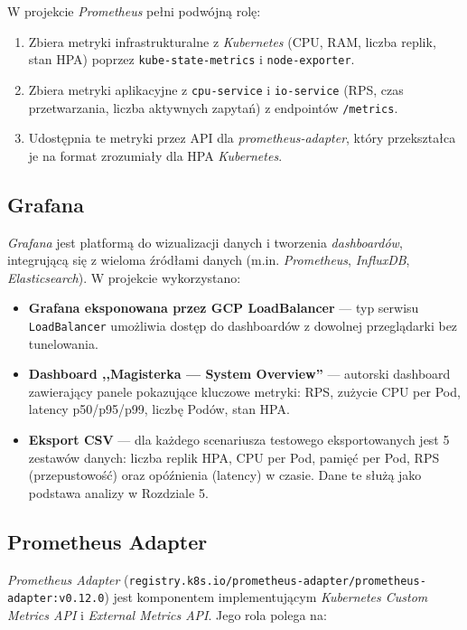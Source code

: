 W projekcie \textit{Prometheus} pełni podwójną rolę:
\begin{enumerate}
  \item Zbiera metryki infrastrukturalne z \textit{Kubernetes} (CPU, RAM, liczba replik, stan HPA) poprzez \texttt{kube-state-metrics} i \texttt{node-exporter}.
  \item Zbiera metryki aplikacyjne z \texttt{cpu-service} i \texttt{io-service} (RPS, czas przetwarzania, liczba aktywnych zapytań) z endpointów \texttt{/metrics}.
  \item Udostępnia te metryki przez API dla \textit{prometheus-adapter}, który przekształca je na format zrozumiały dla HPA \textit{Kubernetes}.
\end{enumerate}

\subsection{Grafana}

\textit{Grafana} jest platformą do wizualizacji danych i tworzenia \textit{dashboardów}, integrującą się z wieloma źródłami danych (m.in. \textit{Prometheus}, \textit{InfluxDB}, \textit{Elasticsearch}). W projekcie wykorzystano:

\begin{itemize}
  \item \textbf{Grafana eksponowana przez GCP LoadBalancer} — typ serwisu \texttt{LoadBalancer} umożliwia dostęp do dashboardów z dowolnej przeglądarki bez tunelowania.
  \item \textbf{Dashboard ,,Magisterka — System Overview''} — autorski dashboard zawierający panele pokazujące kluczowe metryki: RPS, zużycie CPU per Pod, latency p50/p95/p99, liczbę Podów, stan HPA.
  \item \textbf{Eksport CSV} — dla każdego scenariusza testowego eksportowanych jest 5 zestawów danych: liczba replik HPA, CPU per Pod, pamięć per Pod, RPS (przepustowość) oraz opóźnienia (latency) w czasie. Dane te służą jako podstawa analizy w Rozdziale 5.
\end{itemize}

\subsection{Prometheus Adapter}

\textit{Prometheus Adapter} (\texttt{registry.k8s.io/prometheus-adapter/prometheus-adapter:v0.12.0}) jest komponentem implementującym \textit{Kubernetes Custom Metrics API} i \textit{External Metrics API}. Jego rola polega na:

